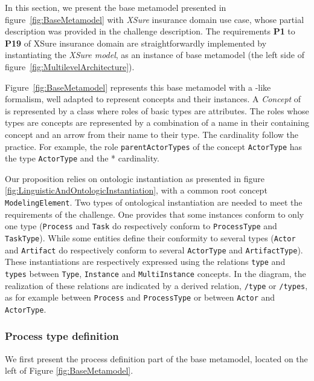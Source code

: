 In this section, we present the base metamodel presented in figure~\ref{fig:BaseMetamodel} with \textit{XSure} insurance domain use case, whose partial description was provided in the challenge description. The requirements \textbf{P1} to \textbf{P19} of XSure insurance domain are straightforwardly implemented by instantiating the \emph{XSure model}, as an instance of base metamodel (the left side of figure~\ref{fig:MultilevelArchitecture}).

Figure~\ref{fig:BaseMetamodel} represents this base metamodel with a \UML-like formalism, well adapted to represent \FML concepts and their instances. A \textit{Concept} of \FML is represented by a \UML class where roles of basic types are attributes. The roles whose types are concepts are represented by a combination of a name in their containing concept and an arrow from their name to their type. The cardinality follow the \UML practice.
For example, the role \texttt{parentActorTypes} of the concept \texttt{ActorType} has the type \texttt{ActorType} and the * cardinality.

Our proposition relies on ontologic instantiation as presented in figure \ref{fig:LinguisticAndOntologicInstantiation}, with a common root concept \texttt{ModelingElement}. Two types of ontological instantiation are needed to meet the requirements of the challenge. One provides that some instances conform to only one type (\texttt{Process} and \texttt{Task} do respectively conform to \texttt{ProcessType} and \texttt{TaskType}). While some entities define their conformity to several types (\texttt{Actor} and \texttt{Artifact} do respectively conform to several \texttt{ActorType} and \texttt{ArtifactType}). These instantiations are respectively expressed using the relations \texttt{type} and \texttt{types} between \texttt{Type}, \texttt{Instance} and \texttt{MultiInstance} concepts. In the diagram, the realization of these relations are indicated by a derived relation, \texttt{/type} or \texttt{/types}, as for example between \texttt{Process} and \texttt{ProcessType} or between \texttt{Actor} and \texttt{ActorType}.

\subsubsection{Process type definition}

We first present the process definition part of the base metamodel, located on the left of Figure \ref{fig:BaseMetamodel}.


